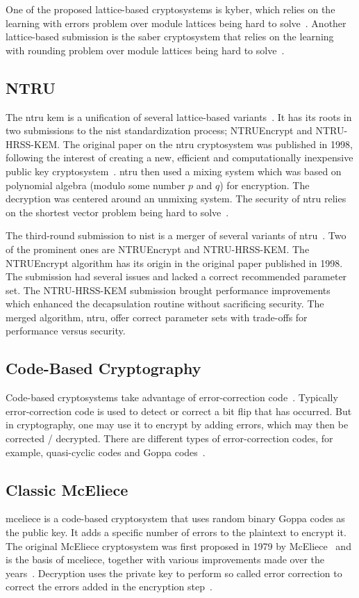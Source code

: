 One of the proposed lattice-based cryptosystems is \gls{kyber}, which relies on the learning with errors problem over module lattices being hard to solve~\cite{kyber2021}. Another lattice-based submission is the \gls{saber} cryptosystem that relies on the learning with rounding problem over module lattices being hard to solve~\cite{saber}.

\subsection{NTRU}

The \gls{ntru} \gls{kem} is a unification of several lattice-based variants~\cite{ntru2020}. It has its roots in two submissions to the \gls{nist} standardization process; NTRUEncrypt and NTRU-HRSS-KEM. The original paper on the \gls{ntru} cryptosystem was published in 1998, following the interest of creating a new, efficient and computationally inexpensive public key cryptosystem~\cite{ntru1998}. \gls{ntru} then used a mixing system which was based on polynomial algebra (modulo some number $p$ and $q$) for encryption. The decryption was centered around an unmixing system. The security of \gls{ntru} relies on the shortest vector problem being hard to solve~\cite{sun2020, ntru1998}.

The third-round submission to \gls{nist} is a merger of several variants of \gls{ntru}~\cite{ntru2020}. Two of the prominent ones are NTRUEncrypt and NTRU-HRSS-KEM. The NTRUEncrypt algorithm has its origin in the original paper published in 1998. The submission had several issues and lacked a correct recommended parameter set. The NTRU-HRSS-KEM submission brought performance improvements which enhanced the decapsulation routine without sacrificing security. The merged algorithm, \gls{ntru}, offer correct parameter sets with trade-offs for performance versus security.

\subsection{Code-Based Cryptography}
Code-based cryptosystems take advantage of error-correction code~\cite{bernstein2017}. Typically error-correction code is used to detect or correct a bit flip that has occurred. But in cryptography, one may use it to encrypt by adding errors, which may then be corrected / decrypted. There are different types of error-correction codes, for example, quasi-cyclic codes and Goppa codes~\cite{sendrier2011}.

\subsection{Classic McEliece}
\label{section:background:mceliece}
\gls{mceliece} is a code-based cryptosystem that uses random binary Goppa codes as the public key. It adds a specific number of errors to the plaintext to encrypt it. The original McEliece cryptosystem was first proposed in 1979 by McEliece~\cite{mceliece1978} and is the basis of \gls{mceliece}, together with various improvements made over the years~\cite{mceliece2020}. Decryption uses the private key to perform so called error correction to correct the errors added in the encryption step~\cite{mceliece2020}.
 
